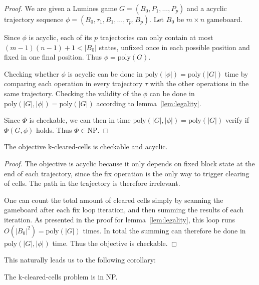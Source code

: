 \begin{proof}
We are given a Lumines game $G = (B_0, P_1, \ldots, P_p)$ and a acyclic trajectory sequence $\phi = (B_0, \tau_1, B_1, \ldots ,\tau_p, B_p)$. Let $B_0$ be $m \times n$ gameboard.

Since $\phi$ is acyclic, each of its $p$ trajectories can only contain at most $(m-1)(n-1) + 1 < |B_0|$ states, unfixed once in each possible position and fixed in one final position. Thus $\phi = \text{poly}(G)$.

Checking whether $\phi$ is acyclic can be done in $\text{poly}(|\phi|) = \text{poly}(|G|)$ time by comparing each operation in every trajectory $\tau$ with the other operations in the same trajectory. Checking the validity of the $\phi$ can be done in $\text{poly}(|G|, |\phi|) = \text{poly}(|G|)$ according to lemma~\ref{lem:legality}.

Since $\Phi$ is checkable, we can then in time $\text{poly}(|G|, |\phi|) = \text{poly}(|G|)$ verify if $\Phi(G, \phi)$ holds. Thus $\Phi \in \text{NP}$.
\end{proof}

\begin{lem}
The objective k-cleared-cells is checkable and acyclic.
\end{lem}

\begin{proof}
The objective is acyclic because it only depends on fixed block state at the end of each trajectory, since the fix operation is the only way to trigger clearing of cells. The path in the trajectory is therefore irrelevant. 

One can count the total amount of cleared cells simply by scanning the gameboard after each fix loop iteration, and then summing the results of each iteration. As presented in the proof for lemma~\ref{lem:legality}, this loop runs $O(|B_0|^2) = \text{poly}(|G|)$ times. In total the summing can therefore be done in $\text{poly}(|G|, |\phi|)$ time. Thus the objective is checkable.
\end{proof}

This naturally leads us to the following corollary:\\

\begin{cor}
The k-cleared-cells problem is in NP.
\end{cor}
